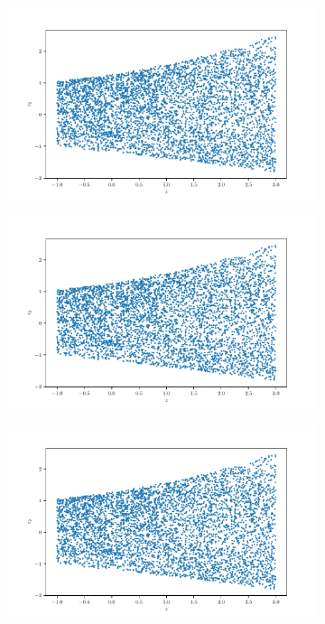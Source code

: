 \documentclass[10pt,a4paper]{article}
\begin{document}
\begin{figure}[!ht]
\begin{subfigure}{0.3\textwidth}
	\caption{}
	\label{fig_yz2}
\end{subfigure}
\begin{subfigure}{0.3\textwidth}
	\centering
	\includegraphics[width=\textwidth] {square_z_z2.pdf}
	\caption{}
	\label{fig_zzo}
\end{subfigure}
\begin{subfigure}{0.3\textwidth}
	\centering	
	\includegraphics[width=\textwidth]{square_z_z2.pdf}
	\caption{}
	\label{fig_zz1}
\end{subfigure}
\begin{subfigure}{0.3\textwidth}
	\centering	
	\includegraphics[width=\textwidth]{square_z_z2.pdf}

\end{subfigure}
\end{figure}
\end{document}
